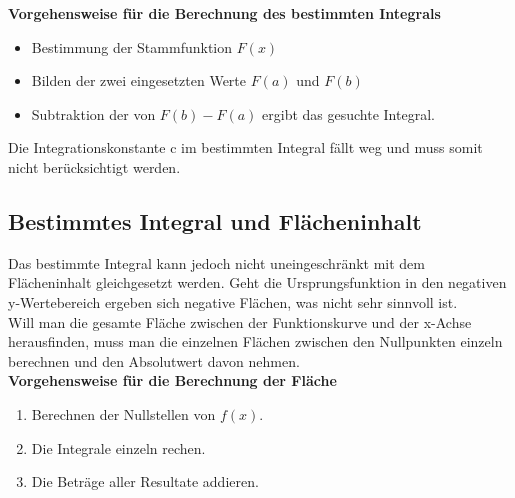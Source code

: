 \documentclass[12pt]{scrartcl}
\begin{document}
\noindent
\textbf{Vorgehensweise für die Berechnung des bestimmten Integrals} 
\begin{itemize}
    \item Bestimmung der Stammfunktion $F(x)$
    \item Bilden der zwei eingesetzten Werte $F(a)$ und $F(b)$
    \item Subtraktion der von $F(b) - F(a)$ ergibt das gesuchte Integral.
\end{itemize}
Die Integrationskonstante c im bestimmten Integral fällt weg und muss somit nicht
berücksichtigt werden.


\subsection{Bestimmtes Integral und Flächeninhalt}
Das bestimmte Integral kann jedoch nicht uneingeschränkt mit dem Flächeninhalt gleichgesetzt 
werden. Geht die Ursprungsfunktion in den negativen y-Wertebereich
ergeben sich negative Flächen, was nicht sehr sinnvoll ist.\\
\noindent
Will man die gesamte Fläche zwischen der Funktionskurve und der x-Achse herausfinden, muss man
die einzelnen Flächen zwischen den Nullpunkten einzeln berechnen und den Absolutwert
davon nehmen.\\

\noindent
\textbf{Vorgehensweise für die Berechnung der Fläche}
\begin{enumerate}
    \item Berechnen der Nullstellen von $f(x)$.
    \item Die Integrale einzeln rechen.
    \item Die Beträge aller Resultate addieren.
\end{enumerate}

\newpage
\end{document}
